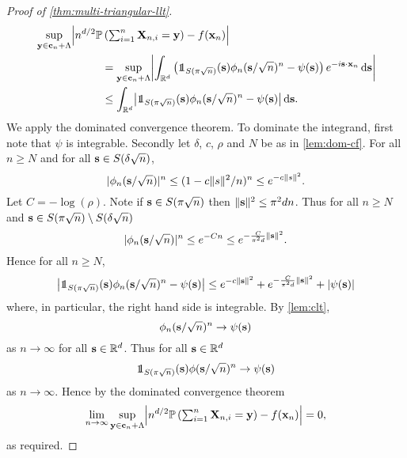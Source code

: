 \begin{proof}[Proof of \cref{thm:multi-triangular-llt}]
\begin{align*}
        &\sup_{\vy \in \vc_n + \lattice} \abs*{
            n^{d/2} \P\left( \textstyle \sum_{i=1}^n \vX_{n, i} = \vy \right) - f(\vx_n)
            } \nonumber \\
        &\hspace{6em} = \sup_{\vy \in \vc_n + \lattice} \abs*{
            \int_{\R^d} \left(\one_{S(\pi \sqrt{n})}(\vs) \phi_n(\vs/\sqrt{n})^n - \psi(\vs)\right) e^{-i\vs \cdot \vx_n} \dif \vs
            } \\
        &\hspace{6em} \leq \int_{\R^d} \abs*{ \one_{S(\pi \sqrt{n})}(\vs) \phi_n(\vs/\sqrt{n})^n - \psi(\vs)} \dif \vs.
    \end{align*}
    We apply the dominated convergence theorem. To dominate the integrand, first note that $\psi$ is integrable. Secondly let $\delta$, $c$, $\rho$ and $N$ be as in \cref{lem:dom-cf}. For all $n \geq N$ and for all ${\mathbf s} \in S(\delta \sqrt{n})$, 
    \begin{equation*}
        \lvert\phi_n({\mathbf s}/\sqrt{n})\rvert^n
        \leq (1 - c \lVert s\rVert^2/n)^n
        \leq e^{-c \lVert s\rVert^2}.
    \end{equation*}
    Let $C = - \log(\rho)$. Note if ${\mathbf s} \in S(\pi \sqrt{n})$ then $\lVert{\mathbf s}\rVert^2 \leq \pi^2 d n$. Thus for all $n \geq N$ and ${\mathbf s} \in S(\pi \sqrt{n}) \setminus S(\delta \sqrt{n})$
    \begin{equation*}
        \lvert\phi_n({\mathbf s}/\sqrt{n})\rvert^n
        \leq e^{-Cn} 
        \leq e^{- \frac{C}{\pi^2 d} \lVert{\mathbf s}\rVert^2}.
    \end{equation*}
    Hence for all $n \geq N$,
    \begin{equation*}
        \abs*{ \one_{S(\pi \sqrt{n})}(\vs) \phi_n(\vs/\sqrt{n})^n - \psi(\vs)}
        \leq e^{-c \norm{\vs}^2} + e^{- \frac{C}{\pi^2 d} \norm{\vs}^2} + \abs{\psi(\vs)}
    \end{equation*}
    where, in particular, the right hand side is integrable. By \cref{lem:clt},
    \begin{equation*}
        \phi_n({\mathbf s}/\sqrt{n})^n \to \psi({\mathbf s})
    \end{equation*}
    as $n \to \infty$ for all ${\mathbf s} \in {\mathbb R}^d$. Thus for all ${\mathbf s} \in {\mathbb R}^d$
    \begin{equation*}
        \one_{S(\pi\sqrt{n})}(\vs) \phi(\vs/\sqrt{n})^n \to \psi(\vs)
    \end{equation*}
    as $n \to \infty$. Hence by the dominated convergence theorem
    \begin{equation*}
        \lim_{n \to \infty} \sup_{\vy \in \vc_n + \lattice} \abs*{
            n^{d/2} \P\left( \textstyle \sum_{i=1}^n \vX_{n, i} = \vy \right) - f(\vx_n)
            } = 0,
    \end{equation*}
    as required.


\end{proof}
